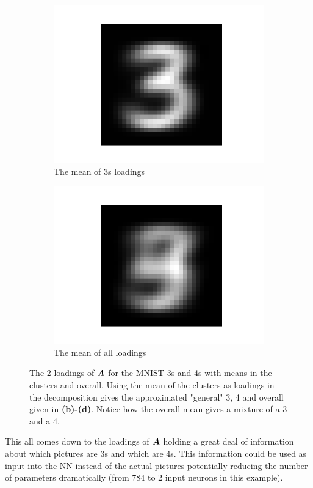 \begin{figure}
    \begin{subfigure}{0.3\linewidth}
    \centering
        \includegraphics[width=.5\linewidth]{Pics/06_results/general3.png}
        \caption{The mean of 3s loadings}
    \end{subfigure}
    \begin{subfigure}{0.3\linewidth}
    \centering
        \includegraphics[width=.5\linewidth]{Pics/06_results/general.png}
        \caption{The mean of all loadings}
        \label{Hej}
    \end{subfigure}
    \caption{The 2 loadings of $\boldsymbol{A}$ for the MNIST 3s and 4s with means in the clusters and overall. Using the mean of the clusters as loadings in the decomposition gives the approximated "general" 3, 4 and overall given in \textbf{(b)-(d)}. Notice how the overall mean gives a mixture of a 3 and a 4. }
    \label{fig:loadingsOfA}
\end{figure}

This all comes down to the loadings of $\boldsymbol{A}$ holding a great deal of information about which pictures are 3s and which are 4s. This information could be used as input into the NN instead of the actual pictures potentially reducing the number of parameters dramatically (from 784 to 2 input neurons in this example). 